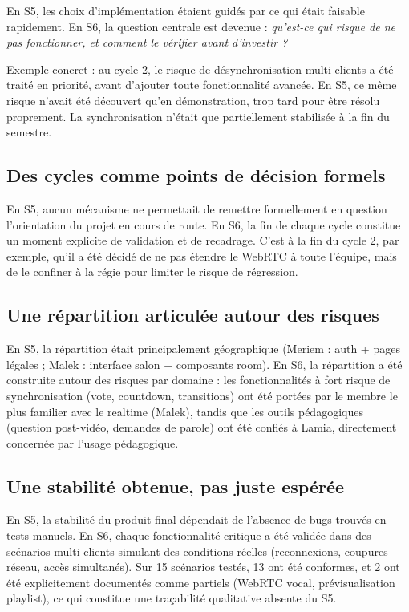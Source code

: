 \documentclass[11pt,a4paper]{report}
\begin{document}
En S5, les choix d'implémentation étaient guidés par ce qui était faisable rapidement. En S6, la question centrale est devenue : \textit{qu'est-ce qui risque de ne pas fonctionner, et comment le vérifier avant d'investir ?}

Exemple concret : au cycle 2, le risque de désynchronisation multi-clients a été traité en priorité, avant d'ajouter toute fonctionnalité avancée. En S5, ce même risque n'avait été découvert qu'en démonstration, trop tard pour être résolu proprement. La synchronisation n'était que partiellement stabilisée à la fin du semestre.

\subsection{Des cycles comme points de décision formels}

En S5, aucun mécanisme ne permettait de remettre formellement en question l'orientation du projet en cours de route. En S6, la fin de chaque cycle constitue un moment explicite de validation et de recadrage. C'est à la fin du cycle 2, par exemple, qu'il a été décidé de ne pas étendre le WebRTC à toute l'équipe, mais de le confiner à la régie pour limiter le risque de régression.

\subsection{Une répartition articulée autour des risques}

En S5, la répartition était principalement géographique (Meriem : auth + pages légales ; Malek : interface salon + composants room). En S6, la répartition a été construite autour des risques par domaine : les fonctionnalités à fort risque de synchronisation (vote, countdown, transitions) ont été portées par le membre le plus familier avec le realtime (Malek), tandis que les outils pédagogiques (question post-vidéo, demandes de parole) ont été confiés à Lamia, directement concernée par l'usage pédagogique.

\subsection{Une stabilité obtenue, pas juste espérée}

En S5, la stabilité du produit final dépendait de l'absence de bugs trouvés en tests manuels. En S6, chaque fonctionnalité critique a été validée dans des scénarios multi-clients simulant des conditions réelles (reconnexions, coupures réseau, accès simultanés). Sur 15 scénarios testés, 13 ont été conformes, et 2 ont été explicitement documentés comme partiels (WebRTC vocal, prévisualisation playlist), ce qui constitue une traçabilité qualitative absente du S5.
\end{document}
